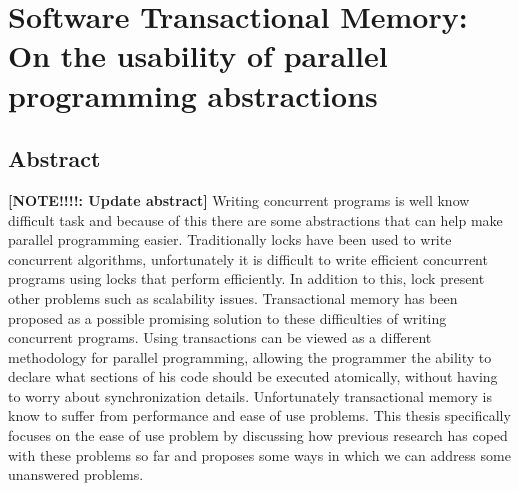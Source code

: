 \documentclass[11pt]{book}
\newcommand{\anote}[1]{{\bf [NOTE!!!!: #1]}}
\begin{document}








\section*{Software Transactional Memory: On the usability of parallel programming abstractions}
\subsection*{Abstract}
\anote{Update abstract}
Writing concurrent programs is well know difficult task and because of this
there are some abstractions that can help make parallel programming easier.
Traditionally locks have been used to write concurrent algorithms, unfortunately it is
difficult to write efficient concurrent programs using locks that perform efficiently.
In addition to this, lock present other problems such as scalability issues.
Transactional memory has been proposed as a possible promising solution to these
difficulties of writing concurrent programs.
Using transactions can be viewed as a different methodology for parallel programming, allowing
the programmer the ability to declare what sections of his code should be executed atomically,
without having to worry about synchronization details.
Unfortunately transactional memory is know to suffer from performance and
ease of use problems.
This thesis specifically focuses on the ease of use problem
by discussing how previous research has coped with these problems so far and proposes some ways in which we can address 
some unanswered problems.
\end{document}
